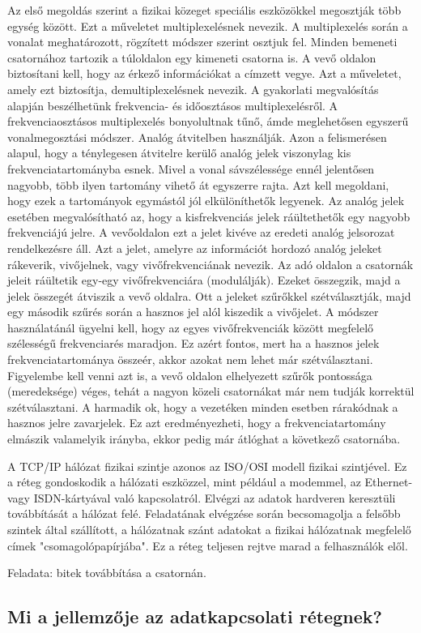 \documentclass[12pt, a4paper]{article}
\begin{document}
\begin{enumerate}
Az első megoldás szerint a fizikai közeget speciális eszközökkel megosztják több egység között. Ezt a műveletet multiplexelésnek nevezik. A multiplexelés során a vonalat meghatározott, rögzített módszer szerint osztjuk fel. Minden bemeneti csatornához tartozik a túloldalon egy kimeneti csatorna is. A vevő oldalon biztosítani kell, hogy az érkező információkat a címzett vegye. Azt a műveletet, amely ezt biztosítja, demultiplexelésnek nevezik. A gyakorlati megvalósítás alapján beszélhetünk frekvencia- és időosztásos multiplexelésről. A frekvenciaosztásos multiplexelés bonyolultnak tűnő, ámde meglehetősen egyszerű vonalmegosztási módszer. Analóg átvitelben használják. Azon a felismerésen alapul, hogy a ténylegesen átvitelre kerülő analóg jelek viszonylag kis frekvenciatartományba esnek. Mivel a vonal sávszélessége ennél jelentősen nagyobb, több ilyen tartomány vihető át egyszerre rajta. Azt kell megoldani, hogy ezek a tartományok egymástól jól elkülöníthetők legyenek. Az analóg jelek esetében megvalósítható az, hogy a kisfrekvenciás jelek ráültethetők egy nagyobb frekvenciájú jelre. A vevőoldalon ezt a jelet kivéve az eredeti analóg jelsorozat rendelkezésre áll. Azt a jelet, amelyre az információt hordozó analóg jeleket rákeverik, vivőjelnek, vagy vivőfrekvenciának nevezik. Az adó oldalon a csatornák jeleit ráültetik egy-egy vivőfrekvenciára (modulálják). Ezeket összegzik, majd a jelek összegét átviszik a vevő oldalra. Ott a jeleket szűrőkkel szétválasztják, majd egy második szűrés során a hasznos jel alól kiszedik a vivőjelet. A módszer használatánál ügyelni kell, hogy az egyes vivőfrekvenciák között megfelelő szélességű frekvenciarés maradjon. Ez azért fontos, mert ha a hasznos jelek frekvenciatartománya összeér, akkor azokat nem lehet már szétválasztani. Figyelembe kell venni azt is, a vevő oldalon elhelyezett szűrők pontossága (meredeksége) véges, tehát a nagyon közeli csatornákat már nem tudják korrektül szétválasztani. A harmadik ok, hogy a vezetéken minden esetben rárakódnak a hasznos jelre zavarjelek. Ez azt eredményezheti, hogy a frekvenciatartomány elmászik valamelyik irányba, ekkor pedig már átlóghat a következő csatornába.

A TCP/IP hálózat fizikai szintje azonos az ISO/OSI modell fizikai szintjével. Ez a réteg gondoskodik a hálózati eszközzel, mint például a modemmel, az Ethernet- vagy ISDN-kártyával való kapcsolatról. Elvégzi az adatok hardveren keresztüli továbbítását a hálózat felé. Feladatának elvégzése során becsomagolja a felsőbb szintek által szállított, a hálózatnak szánt adatokat a fizikai hálózatnak megfelelő címek "csomagolópapírjába". Ez a réteg teljesen rejtve marad a felhasználók elől.

Feladata: bitek továbbítása a csatornán.
\subsection{Mi a jellemzője az adatkapcsolati rétegnek?}

\end{enumerate}
\tableofcontents
\end{document}
